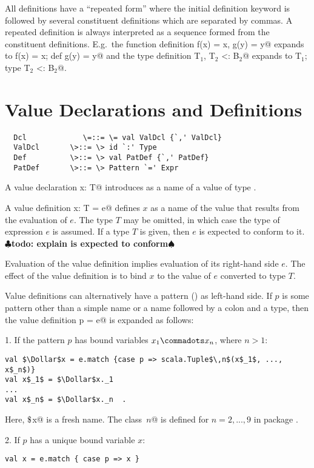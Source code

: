 \documentclass[11pt]{report}
\renewcommand{\todo}[1]{{$\clubsuit$\bf todo: #1$\spadesuit$}}
\begin{document}
All definitions have a ``repeated form'' where the initial
definition keyword is followed by several constituent definitions
which are separated by commas.  A repeated definition is
always interpreted as a sequence formed from the
constituent definitions. E.g.\ the function definition
\verb@def f(x) = x, g(y) = y@ expands to
\verb@def f(x) = x; def g(y) = y@ and
the type definition
\verb@type T$_1$, T$_2$ <: B$_2$@ expands to
\verb@type T$_1$; type T$_2$ <: B$_2$@.

\section{Value Declarations and Definitions}
\label{sec:valdef}

\syntax\begin{verbatim}
  Dcl             \=::= \= val ValDcl {`,' ValDcl}
  ValDcl       \>::= \> id `:' Type
  Def          \>::= \> val PatDef {`,' PatDef}
  PatDef       \>::= \> Pattern `=' Expr
\end{verbatim}

A value declaration \verb@val x: T@ introduces \verb@x@ as a name of a value of
type \verb@T@.  

A value definition \verb@val x: T = e@ defines $x$ as a name of the
value that results from the evaluation of $e$. The type $T$ may be
omitted, in which case the type of expression $e$ is assumed.
If a type $T$ is given, then $e$ is expected to conform to it.
\todo{explain is expected to conform}

Evaluation of the value definition implies evaluation of its
right-hand side $e$.  The effect of the value definition is to bind
$x$ to the value of $e$ converted to type $T$.

Value definitions can alternatively have a pattern
() as left-hand side.  If $p$ is some pattern other
than a simple name or a name followed by a colon and a type, then the
value definition \verb@val p = e@ is expanded as follows:

1. If the pattern $p$ has bound variables $x_1 \commadots x_n$, where $n > 1$:
\begin{verbatim}
val $\Dollar$x = e.match {case p => scala.Tuple$\,n$(x$_1$, ..., x$_n$)}
val x$_1$ = $\Dollar$x._1
...
val x$_n$ = $\Dollar$x._n  .
\end{verbatim}
Here, \verb@$\Dollar$x@ is a fresh name.  The class
\verb@Tuple$\,n$@ is defined for $n = 2,...,9$ in package
\verb@scala@.

2. If $p$ has a unique bound variable $x$:
\begin{verbatim}
val x = e.match { case p => x }
\end{verbatim}
\end{document}
